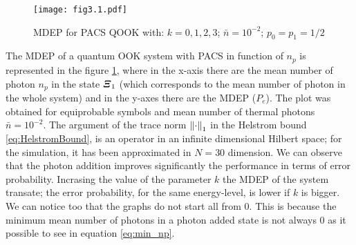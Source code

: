     \begin{figure}[t]
        \begin{center}
            \texttt{[image: fig3.1.pdf]}
            \caption{MDEP for PACS QOOK with: $k=0,1,2,3$; $\bar{n}=10^{-2}$; $p_0=p_1=1/2$}
            \label{fig:3.1}
        \end{center}
    \end{figure}
    The MDEP of a quantum OOK system with PACS in function of $n_p$ is represented in the figure
    \ref{fig:3.1}, where in the x-axis there are the mean number of photon $n_p$ in the state 
    $\Operator{\varXi}_1$ (which corresponds to the mean number of photon in the whole system) and in the 
    y-axes there are the MDEP ($P_e$). The plot was obtained for equiprobable symbols and 
    mean number of thermal photons $\bar{n}=10^{-2}$.  
    The argument of the trace norm $\norm{\cdot}_1$ in the Helstrom bound 
    \ref{eq:HelstromBound}, is an operator in an infinite dimensional Hilbert space; for the 
    simulation, it has been approximated in $N=30$ dimension.
    We can observe that the photon addition improves significantly the performance in terms
    of error probability. Incrasing the value of the parameter $k$ the MDEP of the system 
    transate; the error probability, for the same energy-level, is lower if $k$ is bigger.
    We can notice too that the graphs do not start all from $0$. This is because the minimum
    mean number of photons in a photon added state is not always $0$ as it possible to see in 
    equation \ref{eq:min_np}.  

